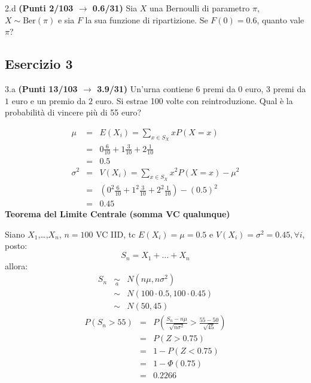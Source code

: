 \documentclass[
  11pt,
]{book}
\theoremstyle{mytheoremstyle}
\theoremstyle{mydefstyle}
\newenvironment{sol}
  {
  \begin{tcolorbox}[enhanced,breakable,arc=0.1mm,boxrule=1pt,colback=white,colframe=iblue,
  title=\bf \fontfamily{lmss}\selectfont \hspace{.5 cm} Soluzione,drop fuzzy shadow]

}{
\end{tcolorbox}
  }
\begin{document}
2.d \textbf{(Punti 2/103 \(\rightarrow\) 0.6/31)} Sia \(X\) una Bernoulli di parametro \(\pi\), \(X\sim\text{Ber}(\pi)\) e sia \(F\) la sua funzione di ripartizione. Se \(F(0)=0.6\), quanto vale \(\pi\)?

\subsection{Esercizio 3}\label{esercizio-3-36}

3.a \textbf{(Punti 13/103 \(\rightarrow\) 3.9/31)} Un'urna contiene 6 premi da \(\mbox{0}\) euro, 3 premi da \(\mbox{1}\) euro e un premio da \(\mbox{2}\) euro.
Si estrae 100 volte con reintroduzione.
Qual è la probabilità di vincere più di 55 euro?

\begin{sol}
\begin{eqnarray*} \mu &=& E(X_i) = \sum_{x\in S_X}x P(X=x)\\ 
 &=&  0  \frac { 6 }{ 10 }+ 1  \frac { 3 }{ 10 }+ 2  \frac { 1 }{ 10 } \\ 
            &=& 0.5 \\ 
 \sigma^2 &=& V(X_i) = \sum_{x\in S_X}x^2 P(X=x)-\mu^2\\ 
 &=&\left(  0  ^2\frac { 6 }{ 10 }+ 1  ^2\frac { 3 }{ 10 }+ 2  ^2\frac { 1 }{ 10 } \right)-( 0.5 )^2\\ 
            &=& 0.45 
\end{eqnarray*}
\textbf{Teorema del Limite Centrale (somma VC qualunque)}

Siano \(X_1\),\ldots,\(X_n\), \(n=100\) VC IID, tc \(E(X_i)=\mu=0.5\) e \(V(X_i)=\sigma^2=0.45,\forall i\), posto:
\[
      S_n = X_1 + ... + X_n
      \]
allora:\begin{eqnarray*}
  S_n & \mathop{\sim}\limits_{a}& N(n\mu,n\sigma^2) \\
     &\sim & N(100\cdot0.5,100\cdot0.45) \\
     &\sim & N(50,45) 
  \end{eqnarray*}\begin{eqnarray*}
      P( S_n   >   55 ) 
        &=& P\left(  \frac { S_n  -  n\mu }{ \sqrt{n\sigma^2} }  >  \frac { 55  -  50 }{\sqrt{ 45 }} \right)  \\
                 &=& P\left(  Z   >   0.75 \right) \\    &=& 1-P(Z< 0.75 )\\ 
                 &=&  1-\Phi( 0.75 ) \\ &=&  0.2266 
      \end{eqnarray*}

\end{sol}
\end{document}
